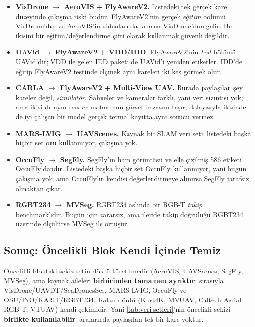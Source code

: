 \begin{itemize}
  \item \textbf{VisDrone $\rightarrow$ AeroVIS + FlyAwareV2.} Listedeki
        tek gerçek kare düzeyinde çakışma riski budur. FlyAwareV2'nin
        gerçek \emph{eğitim} bölümü VisDrone'dur ve AeroVIS'in videoları
        da kısmen VisDrone'dan gelir. Bu ikisini bir eğitim/değerlendirme
        çifti olarak kullanmak güvenli değildir.
  \item \textbf{UAVid $\rightarrow$ FlyAwareV2 + VDD/IDD.} FlyAwareV2'nin
        \emph{test} bölümü UAVid'dir; VDD ile gelen IDD paketi de UAVid'i
        yeniden etiketler. IDD'de eğitip FlyAwareV2 testinde ölçmek aynı
        kareleri iki kez görmek olur.
  \item \textbf{CARLA $\rightarrow$ FlyAwareV2 + Multi-View UAV.} Burada
        paylaşılan şey kareler değil, \emph{simülatör}. Sahneler ve
        kameralar farklı, yani veri sızıntısı yok; ama ikisi de aynı
        render motorunun görsel imzasını taşır, dolayısıyla ikisinde de
        iyi çalışan bir model gerçek termal kayıtta aynı sonucu vermez.
  \item \textbf{MARS-LVIG $\rightarrow$ UAVScenes.} Kaynak bir SLAM
        veri seti; listedeki başka hiçbir set onu kullanmıyor, çakışma
        yok.
  \item \textbf{OccuFly $\rightarrow$ SegFly.} SegFly'ın ham görüntüsü
        ve elle çizilmiş 586 etiketi OccuFly'dandır. Listedeki başka
        hiçbir set OccuFly kullanmıyor, yani bugün çakışma yok; ama
        OccuFly'ın kendisi değerlendirmeye alınırsa SegFly tarafsız
        olmaktan çıkar.
  \item \textbf{RGBT234 $\rightarrow$ MVSeg.} RGBT234 aslında bir RGB-T
        \emph{takip} benchmark'ıdır. Bugün için zararsız, ama ileride
        takip doğruluğu RGBT234 üzerinde ölçülürse MVSeg ile örtüşür.
\end{itemize}

\subsection*{Sonuç: Öncelikli Blok Kendi İçinde Temiz}

Öncelikli bloktaki sekiz setin dördü türetilmedir (AeroVIS, UAVScenes,
SegFly, MVSeg), ama kaynak aileleri \textbf{birbirinden tamamen
ayrıktır}: sırasıyla VisDrone/UAVDT/SeaDronesSee, MARS-LVIG, OccuFly ve
OSU/INO/KAIST/RGBT234. Kalan dördü (Kust4K, MVUAV, Caltech Aerial
RGB-T, VTUAV) kendi çekimidir. Yani \cref{tab:veri-setleri}'nin
öncelikli sekizi \textbf{birlikte kullanılabilir}; aralarında
paylaşılan tek bir kare yoktur.

